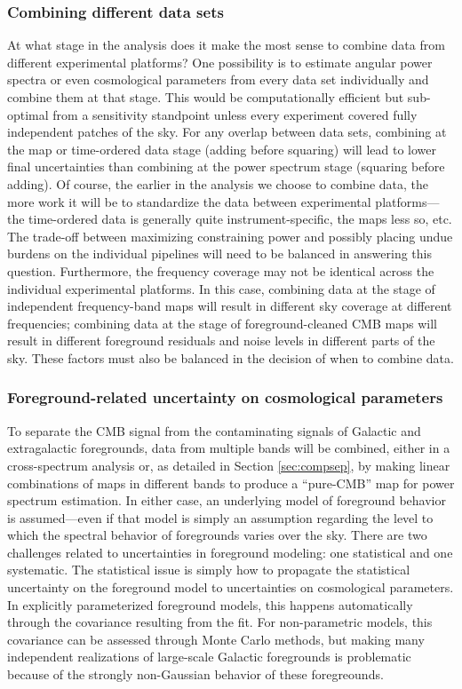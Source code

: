 \subsubsection{Combining different data sets}
\label{se:combine}
At what stage in the analysis does it make the most sense to combine data from different experimental platforms? 
One possibility is to estimate
angular power spectra or even cosmological parameters from every data set individually and combine them at that stage. This would
be computationally efficient but sub-optimal from a sensitivity standpoint unless every experiment
covered fully independent patches of the sky. For any overlap between data sets, combining at
the map or time-ordered data stage (adding before squaring) will lead to lower final uncertainties
than combining at the power spectrum stage (squaring before adding). Of course, the earlier in the analysis
we choose to combine data, the more work it will be to standardize the data between experimental platforms---the
time-ordered data is generally quite instrument-specific, the maps less so, etc. The trade-off between
maximizing constraining power and possibly placing undue burdens on the individual  
pipelines will need to be balanced in answering this question.
Furthermore, the frequency coverage may not be identical across the individual experimental platforms.
In this case, combining data at the stage of independent frequency-band maps will result in
different sky coverage at different frequencies; combining data at the stage of foreground-cleaned
CMB maps will result in different foreground residuals and noise levels in different parts of the sky.
These factors must also be balanced in the decision of when to combine data.

\subsubsection{Foreground-related uncertainty on cosmological parameters}
\label{se:paramforeg}

To separate the CMB signal from the contaminating signals of Galactic and extragalactic foregrounds, 
data from multiple bands will be combined, either 
in a cross-spectrum analysis or, as detailed in Section \ref{sec:compsep}, by making linear 
combinations of maps in different bands to produce a ``pure-CMB'' map for power spectrum estimation.
In either case, an underlying model of foreground behavior is assumed---even if that model is simply
an assumption regarding the level to which the spectral behavior of foregrounds varies over the sky.
There are two challenges related to uncertainties in foreground modeling: one statistical and one
systematic. The statistical issue is simply how to propagate the statistical uncertainty on the foreground 
model to uncertainties on cosmological parameters. In explicitly parameterized foreground models, 
this happens automatically through the covariance resulting from the fit. For non-parametric models,
this covariance can be assessed through Monte Carlo methods, but making many independent 
realizations of large-scale Galactic foregrounds is problematic because of the strongly non-Gaussian
behavior of these foregreounds.

